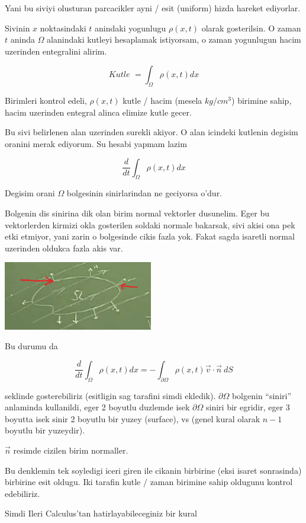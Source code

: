 \documentclass[12pt,fleqn]{article}
\begin{document}
Yani bu siviyi olusturan parcacikler ayni / esit (uniform) hizda hareket
ediyorlar. 

Sivinin $x$ noktasindaki $t$ anindaki yogunlugu $\rho(x,t)$ olarak
gosterilsin. O zaman $t$ aninda $\Omega$ alanindaki kutleyi hesaplamak
istiyorsam, o zaman yogunlugun hacim uzerinden entegralini alirim. 

\[ \textit{Kutle } = \int_\Omega \rho(x,t) dx \]

Birimleri kontrol edeli, $\rho(x,t)$ kutle / hacim (mesela $kg / cm^3$)
birimine sahip, hacim uzerinden entegral alinca elimize kutle gecer. 

Bu sivi belirlenen alan uzerinden surekli akiyor. O alan icindeki kutlenin
degisim oranini merak ediyorum. Su hesabi yapmam lazim

\[ \frac{d}{dt} \int_\Omega \rho(x,t) dx   \]


Degisim orani $\Omega$ bolgesinin sinirlarindan ne geciyorsa o'dur. 

Bolgenin dis sinirina dik olan birim normal vektorler dusunelim. Eger bu
vektorlerden kirmizi okla gosterilen soldaki normale bakarsak, sivi akisi
ona pek etki etmiyor, yani zarin o bolgesinde cikis fazla yok. Fakat sagda
isaretli normal uzerinden oldukca fazla akis var.

\includegraphics[height=3cm]{1_2.png}

Bu durumu da

\[ \frac{d}{dt} \int_\Omega \rho(x,t) dx   = 
- \int_{\partial \Omega} \rho(x,t) \vec{v} \cdot \vec{n} \ dS 
\]

seklinde gosterebiliriz (esitligin sag tarafini simdi ekledik). $\partial
\Omega$ bolgenin 
``siniri'' anlaminda kullanildi, eger 2 boyutlu duzlemde isek
$\partial \Omega$ siniri bir egridir, eger 3 boyutta isek sinir 2 boyutlu bir
yuzey (surface), vs (genel kural olarak $n-1$ boyutlu bir yuzeydir).

$\vec{n}$ resimde cizilen birim normaller. 

Bu denklemin tek soyledigi iceri giren ile cikanin birbirine (eksi isaret
sonrasinda) birbirine esit oldugu. Iki tarafin kutle / zaman birimine sahip
oldugunu kontrol edebiliriz. 

Simdi Ileri Calculus'tan hatirlayabileceginiz bir kural 
\end{document}
